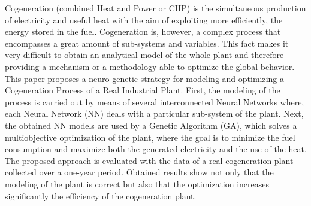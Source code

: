 Cogeneration (combined Heat and Power or CHP) is the simultaneous production of electricity and useful heat with the aim of exploiting more efficiently, the energy stored in the fuel. Cogeneration is, however, a complex process that encompasses a great amount of sub-systems and variables. This fact makes it very difficult to obtain an analytical model of the whole plant and therefore providing a mechanism or a methodology able to optimize the global behavior. This paper proposes a neuro-genetic strategy for modeling and optimizing a Cogeneration Process of a Real Industrial Plant. First, the modeling of the process is carried out by means of several interconnected Neural Networks where, each Neural Network (NN) deals with a particular sub-system of the plant. Next, the obtained NN models are used by a Genetic Algorithm (GA), which solves a multiobjective optimization of the plant, where the goal is to minimize the fuel consumption and maximize both the generated electricity and the use of the heat. The proposed approach is evaluated with the data of a real cogeneration plant collected over a one-year period. Obtained results show not only that the modeling of the plant is correct but also that the optimization increases significantly the efficiency of the cogeneration plant.
